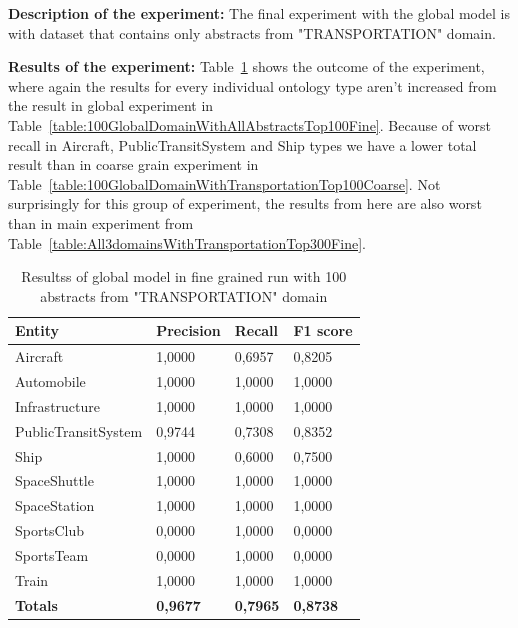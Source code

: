 \documentclass[thesis=M,english]{FITthesis}[2018/05/30]
\begin{document}
	\textbf{Description of the experiment:} The final experiment with the global model is with dataset that contains only abstracts from "TRANSPORTATION" domain.

	\textbf{Results of the experiment:} Table~\ref{table:100GlobalDomainWithTransportationTop100Fine} shows the outcome of the experiment, where again the results for every individual ontology type aren't increased from the result in global experiment in Table~\ref{table:100GlobalDomainWithAllAbstractsTop100Fine}. Because of worst recall in Aircraft, PublicTransitSystem and Ship types we have a lower total result than in coarse grain experiment in Table~\ref{table:100GlobalDomainWithTransportationTop100Coarse}. Not surprisingly for this group of experiment, the results from here are also worst than in main experiment from Table~\ref{table:All3domainsWithTransportationTop300Fine}.

	\begin{table}[H]\centering
		\begin{tabular}{|l|l|l|l|}
			\hline {\textbf{Entity}} & {\textbf{Precision}} & {\textbf{Recall}} & {\textbf{F1 score}}\\\hline
				Aircraft & 1,0000 & 0,6957 & 0,8205\\
				Automobile & 1,0000 & 1,0000 & 1,0000\\				
				Infrastructure & 1,0000 & 1,0000 & 1,0000\\
				PublicTransitSystem & 0,9744 & 0,7308 & 0,8352\\
				Ship & 1,0000 & 0,6000 & 0,7500\\				
				SpaceShuttle & 1,0000 & 1,0000 & 1,0000\\
				SpaceStation & 1,0000 & 1,0000 & 1,0000\\
				SportsClub & 0,0000 & 1,0000 & 0,0000\\
				SportsTeam & 0,0000 & 1,0000 & 0,0000\\
				Train & 1,0000 & 1,0000 & 1,0000\\\hline
				\textbf{Totals} & \textbf{0,9677} & \textbf{0,7965} & \textbf{0,8738}\\\hline
		\end{tabular}
		\caption{Resultss of global model in fine grained run with 100 abstracts from "TRANSPORTATION" domain \label{table:100GlobalDomainWithTransportationTop100Fine}}
	\end{table}		
	
\end{document}
